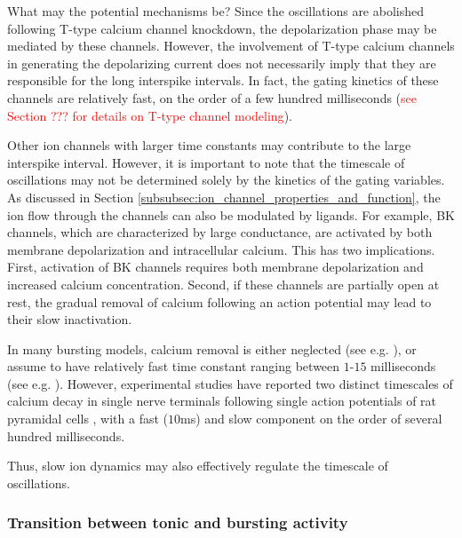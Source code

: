 \documentclass[../main.tex]{subfiles}
\begin{document}
What may the potential mechanisms be? Since the oscillations are abolished following T-type calcium channel knockdown, the depolarization phase may be mediated by these channels. However, the involvement of T-type calcium channels in generating the depolarizing current does not necessarily imply that they are responsible for the long interspike intervals. In fact, the gating kinetics of these channels are relatively fast, on the order of a few hundred milliseconds (\textcolor{red}{see Section ??? for details on T-type channel modeling}).

Other ion channels with larger time constants may contribute to the large interspike interval. However, it is important to note that the timescale of oscillations may not be determined solely by the kinetics of the gating variables. As discussed in Section \ref{subsubsec:ion_channel_properties_and_function}, the ion flow through the channels can also be modulated by ligands. For example, BK channels, which are characterized by large conductance, are activated by both membrane depolarization and intracellular calcium. This has two implications. First, activation of BK channels requires both membrane depolarization and increased calcium concentration. Second, if these channels are partially open at rest, the gradual removal of calcium following an action potential may lead to their slow inactivation.

In many bursting models, calcium removal is either neglected (see e.g. \parencite{wangMultipleDynamicalModes1994,amarilloInterplaySevenSubthreshold2014}), or assume to have relatively fast time constant ranging between $1$-$15$ milliseconds (see e.g. \parencite{mccormickModelElectrophysiologicalProperties1992,golombContributionPersistentNa2006,alonsoVisualizationCurrentsNeural2019,parkMathematicalModelSubthalamic2021}). However, experimental studies have reported two distinct timescales of calcium decay in single nerve terminals following single action potentials of rat pyramidal cells \parencite{koesterCalciumDynamicsAssociated2000}, with a fast ($10$ms) and slow component on the order of several hundred milliseconds.

Thus, slow ion dynamics may also effectively regulate the timescale of oscillations. 


\subsubsection{Transition between tonic and bursting activity} \label{subsubsec:transit_tonic_burst}
\end{document}
